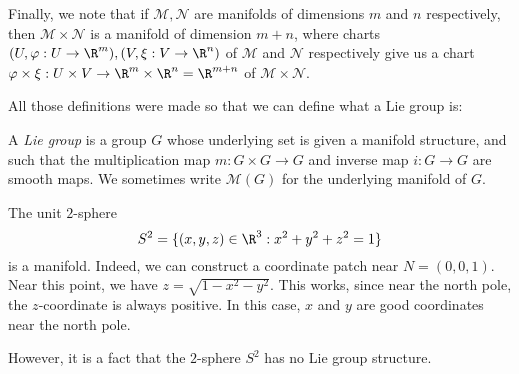 \documentclass[a4paper]{article}
\begin{document}
\begin{defi}
\begin{center}
  \end{center}
\end{defi}

Finally, we note that if $\mathcal{M}, \mathcal{N}$ are manifolds of dimensions $m$ and $n$ respectively, then $\mathcal{M} \times \mathcal{N}$ is a manifold of dimension $m + n$, where charts $(U, \varphi: U \to \R^m), (V, \xi: V \to \R^n)$ of $\mathcal{M}$ and $\mathcal{N}$ respectively give us a chart $\varphi \times \xi: U \times V \to \R^m \times \R^n = \R^{m + n}$ of $\mathcal{M} \times \mathcal{N}$.

All those definitions were made so that we can define what a Lie group is:

\begin{defi}
  A \emph{Lie group} is a group $G$ whose underlying set is given a manifold structure, and such that the multiplication map $m: G \times G \to G$ and inverse map $i: G \to G$ are smooth maps. We sometimes write $\mathcal{M}(G)$ for the underlying manifold of $G$.
\end{defi}

\begin{eg}
  The unit $2$-sphere
  \[
    S^2 = \{(x, y, z) \in \R^3: x^2 + y^2 + z^2 = 1\}
  \]
  is a manifold. Indeed, we can construct a coordinate patch near $N = (0, 0, 1)$. Near this point, we have $z = \sqrt{1 - x^2 - y^2}$. This works, since near the north pole, the $z$-coordinate is always positive. In this case, $x$ and $y$ are good coordinates near the north pole.

  However, it is a fact that the $2$-sphere $S^2$ has no Lie group structure.
\end{eg}
\end{document}
